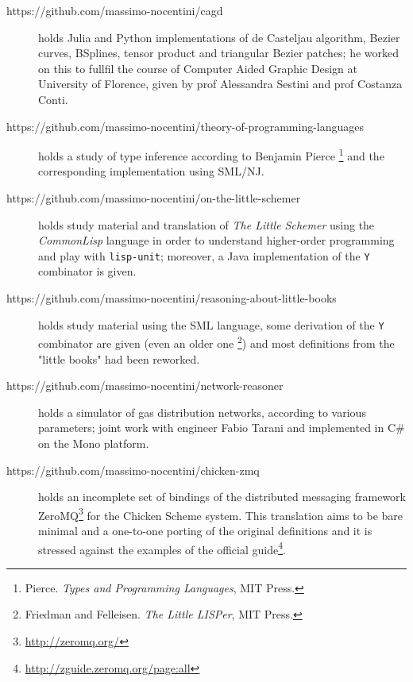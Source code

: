 \documentclass[a4paper]{article} %
\begin{document}
\begin{description}
        \item[https://github.com/massimo-nocentini/cagd] holds Julia and Python
        implementations of de Casteljau algorithm, Bezier curves, BSplines,
        tensor product and triangular Bezier patches; he worked on this to
        fullfil the  course of Computer Aided Graphic Design at University of
        Florence, given by prof Alessandra Sestini and prof Costanza Conti.

        \item[https://github.com/massimo-nocentini/theory-of-programming-languages]
        holds a study of type inference according to Benjamin Pierce
        \footnote{Pierce. \textit{Types and Programming Languages}, MIT Press.} and
        the corresponding implementation using SML/NJ.

        \item[https://github.com/massimo-nocentini/on-the-little-schemer] holds
        study material and translation of \textit{The Little Schemer} using the
        \textit{CommonLisp} language in order to understand higher-order
        programming and play with \verb|lisp-unit|; moreover, a Java
        implementation of the \verb|Y| combinator is given.

        \item[https://github.com/massimo-nocentini/reasoning-about-little-books]
        holds study material using the SML language, some derivation of the \verb|Y|
        combinator are given (even an older one \footnote{Friedman and Felleisen.
        \textit{The Little LISPer}, MIT Press.}) and most definitions from
        the "little books" had been reworked.

        \item[https://github.com/massimo-nocentini/network-reasoner] holds a
        simulator of gas distribution networks, according to various
        parameters; joint work with engineer Fabio Tarani and implemented in
        C\# on the Mono platform.

        \item[https://github.com/massimo-nocentini/chicken-zmq] holds an
        incomplete set of bindings of the distributed messaging framework
        ZeroMQ\footnote{\url{http://zeromq.org/}} for the Chicken Scheme
        system. This translation aims to be bare minimal and a one-to-one
        porting of the original definitions and it is stressed against
        the examples of the official
        guide\footnote{\url{http://zguide.zeromq.org/page:all}}.

        
    \end{description}
\end{document}
